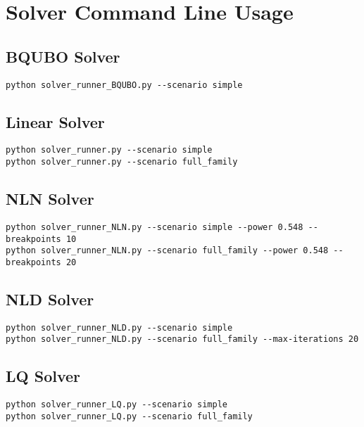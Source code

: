\documentclass[11pt,a4paper]{article}
\begin{document}
\section{Solver Command Line Usage}

\subsection{BQUBO Solver}
\begin{verbatim}
python solver_runner_BQUBO.py --scenario simple
\end{verbatim}

\subsection{Linear Solver}
\begin{verbatim}
python solver_runner.py --scenario simple
python solver_runner.py --scenario full_family
\end{verbatim}

\subsection{NLN Solver}
\begin{verbatim}
python solver_runner_NLN.py --scenario simple --power 0.548 --breakpoints 10
python solver_runner_NLN.py --scenario full_family --power 0.548 --breakpoints 20
\end{verbatim}

\subsection{NLD Solver}
\begin{verbatim}
python solver_runner_NLD.py --scenario simple
python solver_runner_NLD.py --scenario full_family --max-iterations 20
\end{verbatim}

\subsection{LQ Solver}
\begin{verbatim}
python solver_runner_LQ.py --scenario simple
python solver_runner_LQ.py --scenario full_family
\end{verbatim}
\end{document}
